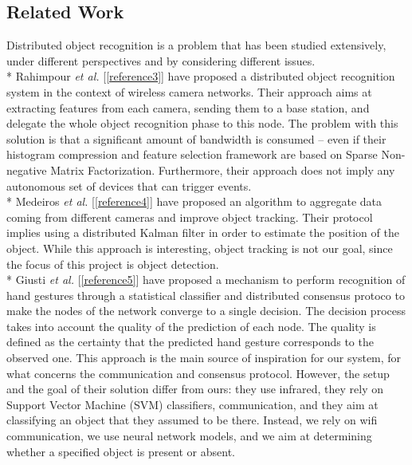 \documentclass[10pt,conference,compsocconf]{IEEEtran}
\begin{document}
\subsection{Related Work}
Distributed object recognition is a problem that has been studied extensively, under different perspectives and by considering different issues.\\*
Rahimpour \textit{et al.} [\ref{reference3}] have proposed a distributed object recognition system in the context of wireless camera networks. Their approach aims at extracting features from each camera, sending them to a base station, and delegate the whole object recognition phase to this node. The problem with this solution is that a significant amount of bandwidth is consumed -- even if their histogram compression and feature selection framework are based on Sparse Non-negative Matrix Factorization. Furthermore, their approach does not imply any autonomous set of devices that can trigger events.\\*
Medeiros \textit{et al.} [\ref{reference4}] have proposed an algorithm to aggregate data coming from different cameras and improve object tracking. Their protocol implies using a distributed Kalman filter in order to estimate the position of the object. While this approach is interesting, object tracking is not our goal, since the focus of this project is object detection.\\*
Giusti \textit{et al.} [\ref{reference5}] have proposed a mechanism to perform recognition of hand gestures through a statistical classifier and distributed consensus protoco to make the nodes of the network converge to a single decision. The decision process takes into account the quality of the prediction of each node. The quality is defined as the certainty that the predicted hand gesture corresponds to the observed one. This approach is the main source of inspiration for our system, for what concerns the communication and consensus protocol. However, the setup and the goal of their solution differ from ours: they use infrared, they rely on Support Vector Machine (SVM) classifiers, communication, and they aim at classifying an object that they assumed to be there. Instead, we rely on wifi communication, we use neural network models, and we aim at determining whether a specified object is present or absent.
\end{document}
